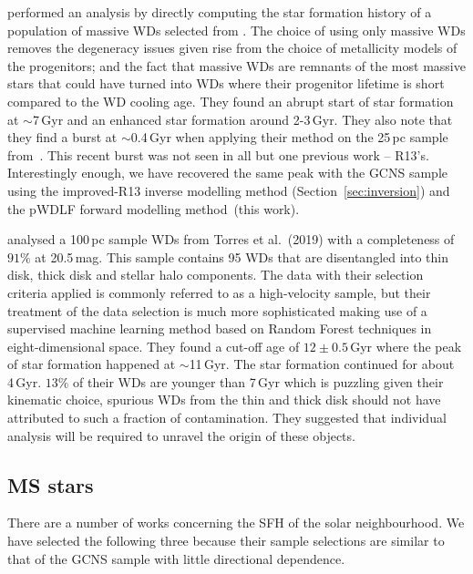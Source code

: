 \documentclass[fleqn,usenatbib]{mnras}
\begin{document}
\textit{\citet{2019ApJ...878L..11I}} performed an analysis by directly
computing the star formation history of a population of massive WDs selected
from \citet{2019Natur.565..202T}. The choice of using only massive WDs
removes the degeneracy issues given rise from the choice of metallicity models
of the progenitors; and the fact that massive WDs are remnants of the most
massive stars that could have turned into WDs where their progenitor lifetime
is short compared to the WD cooling age. They found an abrupt start of star
formation at $\sim$7\,Gyr and an enhanced star formation around 2-3\,Gyr. They
also note that they find a burst at $\sim$0.4\,Gyr when applying their method
on the 25\,pc sample from~\citet{2017ASPC..509...59O}. This recent burst was not
seen in all but one previous work -- R13's. Interestingly enough, we have
recovered the same peak with the GCNS sample using the improved-R13 inverse
modelling method (Section~\ref{sec:inversion}) and the pWDLF forward modelling
method~(this work). 

\textit{\citet{2021MNRAS.502.1753T}} analysed a 100\,pc sample WDs from
Torres et al.~(2019) with a completeness of $91\%$ at 20.5\,mag. This sample
contains 95 WDs that are disentangled into thin disk, thick disk and stellar
halo components. The data with their selection criteria applied is commonly
referred to as a high-velocity sample, but their treatment of the data
selection is much more sophisticated making use of a supervised
machine learning method based on Random Forest techniques in eight-dimensional
space. They found a cut-off age of $12\pm0.5$\,Gyr where the peak of star
formation happened at $\sim$11\,Gyr. The star formation continued for about
4\,Gyr. $13\%$ of their WDs are younger than 7\,Gyr which is puzzling given
their kinematic choice, spurious WDs from the thin and thick disk should not
have attributed to such a fraction of contamination. They suggested that
individual analysis will be required to unravel the origin of these objects.

\subsection{MS stars}
There are a number of works concerning the SFH of the solar neighbourhood. We
have selected the following three because their sample selections are similar
to that of the GCNS sample with little directional dependence.
\end{document}
